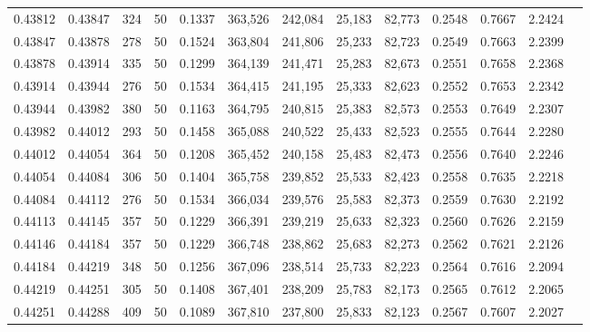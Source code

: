 \begin{tabular}{rrrrrrrrrrrrr}
0.43812 & 0.43847 &   324 &  50 &                                     0.1337 & 363,526 & 242,084 &  25,183 &  82,773 & 0.2548 & 0.7667 & 2.2424 \\
0.43847 & 0.43878 &   278 &  50 &                                     0.1524 & 363,804 & 241,806 &  25,233 &  82,723 & 0.2549 & 0.7663 & 2.2399 \\
0.43878 & 0.43914 &   335 &  50 &                                     0.1299 & 364,139 & 241,471 &  25,283 &  82,673 & 0.2551 & 0.7658 & 2.2368 \\
0.43914 & 0.43944 &   276 &  50 &                                     0.1534 & 364,415 & 241,195 &  25,333 &  82,623 & 0.2552 & 0.7653 & 2.2342 \\
0.43944 & 0.43982 &   380 &  50 &                                     0.1163 & 364,795 & 240,815 &  25,383 &  82,573 & 0.2553 & 0.7649 & 2.2307 \\
0.43982 & 0.44012 &   293 &  50 &                                     0.1458 & 365,088 & 240,522 &  25,433 &  82,523 & 0.2555 & 0.7644 & 2.2280 \\
0.44012 & 0.44054 &   364 &  50 &                                     0.1208 & 365,452 & 240,158 &  25,483 &  82,473 & 0.2556 & 0.7640 & 2.2246 \\
0.44054 & 0.44084 &   306 &  50 &                                     0.1404 & 365,758 & 239,852 &  25,533 &  82,423 & 0.2558 & 0.7635 & 2.2218 \\
0.44084 & 0.44112 &   276 &  50 &                                     0.1534 & 366,034 & 239,576 &  25,583 &  82,373 & 0.2559 & 0.7630 & 2.2192 \\
0.44113 & 0.44145 &   357 &  50 &                                     0.1229 & 366,391 & 239,219 &  25,633 &  82,323 & 0.2560 & 0.7626 & 2.2159 \\
0.44146 & 0.44184 &   357 &  50 &                                     0.1229 & 366,748 & 238,862 &  25,683 &  82,273 & 0.2562 & 0.7621 & 2.2126 \\
0.44184 & 0.44219 &   348 &  50 &                                     0.1256 & 367,096 & 238,514 &  25,733 &  82,223 & 0.2564 & 0.7616 & 2.2094 \\
0.44219 & 0.44251 &   305 &  50 &                                     0.1408 & 367,401 & 238,209 &  25,783 &  82,173 & 0.2565 & 0.7612 & 2.2065 \\
0.44251 & 0.44288 &   409 &  50 &                                     0.1089 & 367,810 & 237,800 &  25,833 &  82,123 & 0.2567 & 0.7607 & 2.2027 \\

\end{tabular}
